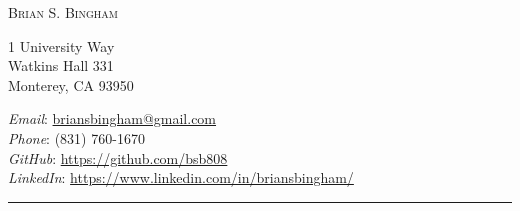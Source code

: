 \documentclass[11pt]{article}
\makeatletter
\newcommand{\myname}{Brian S. Bingham}     %
\newcommand{\githuburl}{https://github.com/bsb808}
\newcommand{\linkedinurl}{https://www.linkedin.com/in/briansbingham/}
\newcommand{\websitename}{me.com}       %
\newcommand{\phone}{(831) 760-1670}       %
\newcommand{\email}{briansbingham@gmail.com}  %
\newcommand{\address}{                  %
1 University Way\\ 
Watkins Hall 331\\                    
Monterey, CA 93950                       
}
\makeatother
\begin{document}
\thispagestyle{first}


%

\hspace*{-\parindent}%
\begin{center}
  \vspace{-2em}
  {\LARGE\scshape \myname} \\
\end{center}
\begin{minipage}[t]{0.4\linewidth}
\address
\end{minipage}
\hspace*{-\parindent}%
\begin{minipage}[t]{0.6\linewidth}
\begin{flushright}
  \textit{Email}: \href{mailto:\email}{\email} \\
  \textit{Phone}: \phone \\
  \textit{GitHub}: \href{\githuburl}{\githuburl} \\
  \textit{LinkedIn}: \href{\linkedinurl}{\linkedinurl} \\
\end{flushright}
\end{minipage}
\begin{center}
  \vspace{-.5em}
  \rule{\textwidth}{1pt}  
\end{center}

\end{document}

